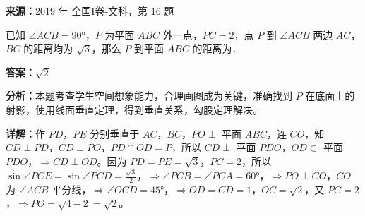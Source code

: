 \begin{question}[points=5]
\textbf{来源：}2019 年 全国I卷-文科，第 16 题\par
已知 $\angle ACB = 90°$，$P$ 为平面 $ABC$ 外一点，$PC=2$，点 $P$ 到 $\angle ACB$ 两边 $AC$，$BC$ 的距离均为 $\sqrt{3}$，那么 $P$ 到平面 $ABC$ 的距离为．
\fillin[{$\sqrt{2}$}]
\begin{solution}
\textbf{答案：}$\sqrt{2}$

\textbf{分析：}本题考查学生空间想象能力，合理画图成为关键，准确找到 $P$ 在底面上的射影，使用线面垂直定理，得到垂直关系，勾股定理解决。

\textbf{详解：}作 $PD$，$PE$ 分别垂直于 $AC$，$BC$，$PO \perp$ 平面 $ABC$，连 $CO$，知 $CD \perp PD$，$CD \perp PO$，$PD \cap OD = P$，所以 $CD \perp$ 平面 $PDO$，$OD \subset$ 平面 $PDO$，$\Rightarrow CD \perp OD$。因为 $PD = PE = \sqrt{3}$，$PC=2$，所以 $\sin\angle PCE = \sin\angle PCD = \frac{\sqrt{3}}{2}$，$\Rightarrow \angle PCB = \angle PCA = 60°$，$\Rightarrow PO \perp CO$，$CO$ 为 $\angle ACB$ 平分线，$\Rightarrow \angle OCD = 45°$，$\Rightarrow OD = CD = 1$，$OC = \sqrt{2}$，又 $PC=2$，$\Rightarrow PO = \sqrt{4-2} = \sqrt{2}$。
\end{solution}
\end{question}

